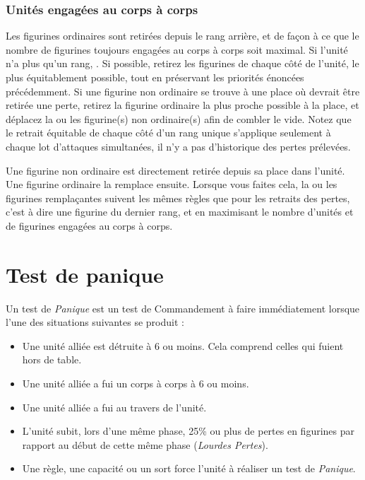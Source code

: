 \subsubsection*{Unités engagées au corps à corps}

Les figurines ordinaires sont retirées depuis le rang arrière, et de façon à ce que le nombre de figurines toujours engagées au corps à corps soit maximal.
Si l'unité n'a plus qu'un rang, . Si possible, retirez les figurines de chaque côté de l'unité, le plus équitablement possible, tout en préservant les priorités énoncées précédemment. Si une figurine non ordinaire se trouve à une place où devrait être retirée une perte, retirez la figurine ordinaire la plus proche possible à la place, et déplacez la ou les figurine(s) non ordinaire(s) afin de combler le vide. Notez que le retrait équitable de chaque côté d'un rang unique s'applique seulement à chaque lot d'attaques simultanées, il n'y a pas d'historique des pertes prélevées.

Une figurine non ordinaire est directement retirée depuis sa place dans l'unité. Une figurine ordinaire la remplace ensuite. Lorsque vous faites cela, la ou les figurines remplaçantes suivent les mêmes règles que pour les retraits des pertes, c'est à dire une figurine du dernier rang, et en maximisant le nombre d'unités et de figurines engagées au corps à corps.

\section{Test de panique}

Un test de \emph{Panique} est un test de Commandement à faire immédiatement lorsque l'une des situations suivantes se produit :
\begin{itemize}[label={-}]
\item Une unité alliée est détruite à 6{\pouce} ou moins. Cela comprend celles qui fuient hors de table.
\item Une unité alliée a fui un corps à corps à 6{\pouce} ou moins.
\item Une unité alliée a fui au travers de l'unité.
\item L'unité subit, lors d'une même phase, 25\% ou plus de pertes en figurines par rapport au début de cette même phase (\emph{Lourdes Pertes}).
\item Une règle, une capacité ou un sort force l'unité à réaliser un test de \emph{Panique}.
\end{itemize}

